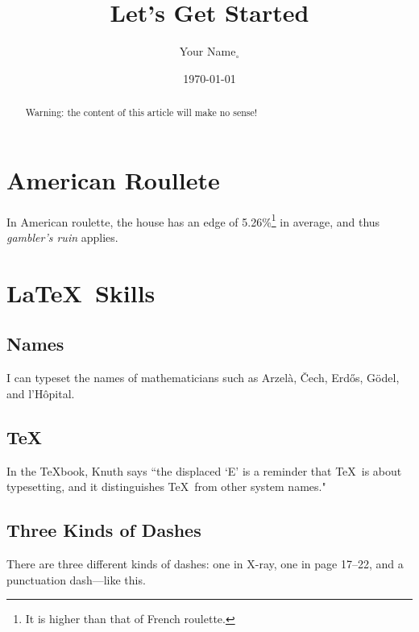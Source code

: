 \documentclass{amsart}
\begin{document}
\title{Let's Get Started}
\author{Your Name$_\circ$}
\date{\today}

\begin{abstract}
Warning: the content of this article will make no sense!
\end{abstract}

\maketitle

\section{American Roullete}

In American roulette, the house has an edge of 5.26\%\footnote{It is higher than that of French roulette.} in average,
and thus \emph{gambler's ruin} applies.

\section{\LaTeX\ Skills}

\subsection{Names}

I can typeset the names of mathematicians such as Arzel\`a, \v{C}ech, Erd\H{o}s,
G\"odel, and l'H\^opital.

\subsection{\TeX}

In the \TeX book, Knuth says ``the displaced `E' is a reminder that \TeX\
is about typesetting, and it distinguishes \TeX\ from other system names."

\subsection{Three Kinds of Dashes}

There are three different kinds of dashes: one in X-ray, one in page 17--22,
and a punctuation dash---like this.
\end{document}
